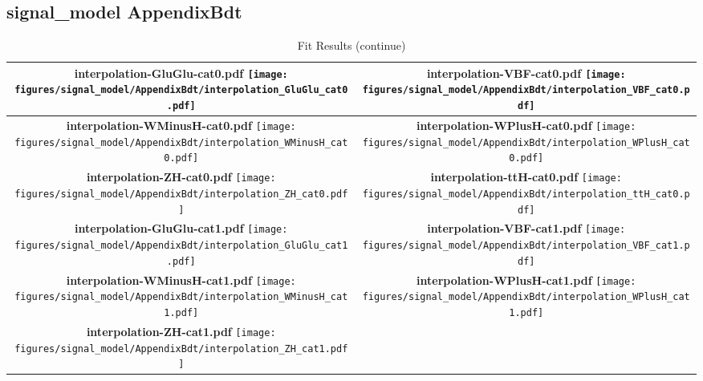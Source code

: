 \subsection{signal\_model AppendixBdt}
\begin{longtable}{|c|c|}
\caption{Fit Results}
\endfirsthead
\caption{Fit Results (continue)}
\endhead
\hline
\parbox{0.47\textwidth}{
\centering
{\bfseries interpolation-GluGlu-cat0.pdf}
\texttt{[image: figures/signal\_model/AppendixBdt/interpolation\_GluGlu\_cat0.pdf]}
}
 & \parbox{0.47\textwidth}{
\centering
{\bfseries interpolation-VBF-cat0.pdf}
\texttt{[image: figures/signal\_model/AppendixBdt/interpolation\_VBF\_cat0.pdf]}
}
 \\
\hline
\parbox{0.47\textwidth}{
\centering
{\bfseries interpolation-WMinusH-cat0.pdf}
\texttt{[image: figures/signal\_model/AppendixBdt/interpolation\_WMinusH\_cat0.pdf]}
}
 & \parbox{0.47\textwidth}{
\centering
{\bfseries interpolation-WPlusH-cat0.pdf}
\texttt{[image: figures/signal\_model/AppendixBdt/interpolation\_WPlusH\_cat0.pdf]}
}
 \\
\hline
\parbox{0.47\textwidth}{
\centering
{\bfseries interpolation-ZH-cat0.pdf}
\texttt{[image: figures/signal\_model/AppendixBdt/interpolation\_ZH\_cat0.pdf]}
}
 & \parbox{0.47\textwidth}{
\centering
{\bfseries interpolation-ttH-cat0.pdf}
\texttt{[image: figures/signal\_model/AppendixBdt/interpolation\_ttH\_cat0.pdf]}
}
 \\
\hline
\parbox{0.47\textwidth}{
\centering
{\bfseries interpolation-GluGlu-cat1.pdf}
\texttt{[image: figures/signal\_model/AppendixBdt/interpolation\_GluGlu\_cat1.pdf]}
}
 & \parbox{0.47\textwidth}{
\centering
{\bfseries interpolation-VBF-cat1.pdf}
\texttt{[image: figures/signal\_model/AppendixBdt/interpolation\_VBF\_cat1.pdf]}
}
 \\
\hline
\parbox{0.47\textwidth}{
\centering
{\bfseries interpolation-WMinusH-cat1.pdf}
\texttt{[image: figures/signal\_model/AppendixBdt/interpolation\_WMinusH\_cat1.pdf]}
}
 & \parbox{0.47\textwidth}{
\centering
{\bfseries interpolation-WPlusH-cat1.pdf}
\texttt{[image: figures/signal\_model/AppendixBdt/interpolation\_WPlusH\_cat1.pdf]}
}
 \\
\hline
\parbox{0.47\textwidth}{
\centering
{\bfseries interpolation-ZH-cat1.pdf}
\texttt{[image: figures/signal\_model/AppendixBdt/interpolation\_ZH\_cat1.pdf]}
}
\end{longtable}
